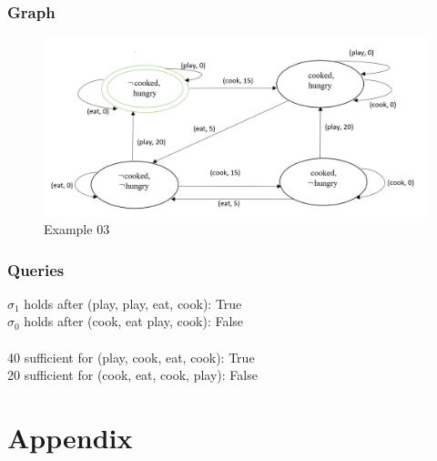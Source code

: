 \documentclass[11pt]{article}
\begin{document}
	\subsubsection{Graph}\label{par:p403}
	\begin{figure}[H]
		\includegraphics[width=1\linewidth, height=0.3\textheight]{./media/figure01.png}
		\caption{Example 03}
		\label{Figure:f03}
	\end{figure}
	\subsubsection{Queries}
	$\sigma_{1}$ holds after (play, play, eat, cook): True\\
	$\sigma_{0}$ holds after (cook, eat play, cook): False\\
	\\
	40 sufficient for (play, cook, eat, cook): True\\
	20 sufficient for (cook, eat, cook, play): False\\
	\newpage
	\section{Appendix}	
	\begin{appendix}
		\listoffigures
		\listoftables
	\end{appendix}
\end{document}
